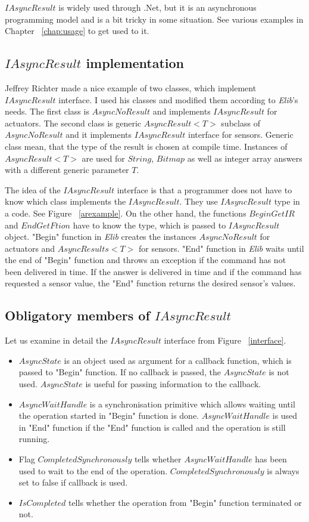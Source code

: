 \documentclass[12pt,notitlepage]{report}
\begin{document}
	$IAsyncResult$ is widely used through .Net, but it is an asynchronous programming model
	and is a bit tricky in some situation. See various examples in Chapter ~\ref{chap:usage} 
	to get used to it.

\subsection{$IAsyncResult$ implementation} \label{sec:iasyncimpl}
	Jeffrey Richter \cite{IAsync} made a nice example of two classes, which implement $IAsyncResult$ interface.
	I used his classes and modified them according to {\it Elib}'s needs.
	The first class is $AsyncNoResult$ and implements $IAsyncResult$ for actuators.
	The second class is generic $AsyncResult<T>$ subclass of $AsyncNoResult$ and 
	it implements $IAsyncResult$ interface for sensors.
	Generic class mean, that the type of the result is chosen at compile time. %
	Instances of $AsyncResult<T>$ are used
	for $String$, $Bitmap$ as well as integer array answers with a different generic parameter $T$.
	
	The idea of the $IAsyncResult$ interface is that a programmer does not have to know which
	class implements the $IAsyncResult$. They use $IAsyncResult$ type in a code. See Figure ~\ref{arexample}. 
	On the other hand, the functions $BeginGetIR$ and $EndGetFtion$ have to know the type, which is passed to $IAsyncResult$ object.
	"Begin" function in {\it Elib} creates the instances $AsyncNoResult$ for actuators and $AsyncResults<T>$ for sensors.
	"End" function in {\it Elib} waits until the end of "Begin" function and 
	throws an exception if the command has not been delivered in time.
	If the answer is delivered in time and if the command has requested a sensor value, 
	the "End" function returns the desired sensor's values.
	
\subsection*{Obligatory members of $IAsyncResult$} \label{sec:iasyncmemb}
	Let us examine in detail the $IAsyncResult$ interface from Figure ~\ref{interface}. 
	\begin{itemize}
	\item $AsyncState$ is an object used as argument for a callback function, which
	is passed to "Begin" function. If no callback is passed, the $AsyncState$ is not used. 
	$AsyncState$ is useful for passing information to the callback.
	\item $AsyncWaitHandle$ is a synchronisation primitive which allows waiting until the operation 
	started in "Begin" function is done.
	$AsyncWaitHandle$ is used in "End" function if the "End" function is called 
	and the operation is still running. 
	\item Flag $CompletedSynchronously$ tells whether  
	$AsyncWaitHandle$ has been used to wait to the end of the operation.
	$CompletedSynchronously$ is always set to false if callback is used.
	\item $IsCompleted$ tells whether the operation from "Begin" function terminated or not.
	\end{itemize}
\end{document}
